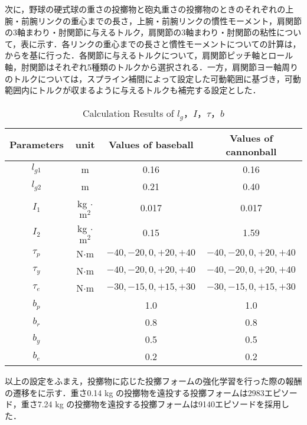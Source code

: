 次に，野球の硬式球の重さの投擲物と砲丸重さの投擲物のときのそれぞれの上腕・前腕リンクの重心までの長さ，上腕・前腕リンクの慣性モーメント，肩関節の3軸まわり・肘関節に与えるトルク，肩関節の3軸まわり・肘関節の粘性について，表に示す．各リンクの重心までの長さと慣性モーメントについての計算は，からを基に行った．各関節に与えるトルクについて，肩関節ピッチ軸とロール軸，肘関節はそれぞれ5種類のトルクから選択される．一方，肩関節ヨー軸周りのトルクについては，スプライン補間によって設定した可動範囲に基づき，可動範囲内にトルクが収まるように与えるトルクも補完する設定とした．

\begin{table}[tb]
  \begin{center}
    \caption{Calculation Results of $l_{g}$，$I$，$\tau$，$b$}

    \begin{tabular}{c|c|c|c}
      \hline
      Parameters & unit & Values of baseball & Values of cannonball \\
      \hline
      $l_{g1}$ & m & 0.16 & 0.16 \\
      $l_{g2}$ & m & 0.21 & 0.40 \\
      $I_{1}$ & kg $\cdot$ $\mathrm{m}^2$ & 0.017 & 0.017 \\
      $I_{2}$ & kg $\cdot$ $\mathrm{m}^2$ & 0.15 & 1.59 \\
      $\tau_{p}$ & N$\cdot$m & $-40, -20, 0, +20, +40$ & $-40, -20, 0, +20, +40$ \\
      $\tau_{y}$ & N$\cdot$m & $-40, -20, 0, +20, +40$ & $-40, -20, 0, +20, +40$ \\
      $\tau_{e}$ & N$\cdot$m & $-30, -15, 0, +15, +30$ & $-30, -15, 0, +15, +30$ \\
      $b_{p}$ &  & 1.0 & 1.0\\
      $b_{r}$ &  & 0.8 & 0.8\\
      $b_{y}$ &  & 0.5 & 0.5\\
      $b_{e}$ &  & 0.2 & 0.2\\
      \hline
    \end{tabular}
  \end{center}
\end{table}

以上の設定をふまえ，投擲物に応じた投擲フォームの強化学習を行った際の報酬の遷移をに示す．重さ0.14 kg の投擲物を遠投する投擲フォームは2983エピソード，重さ7.24 kg の投擲物を遠投する投擲フォームは9140エピソードを採用した．


